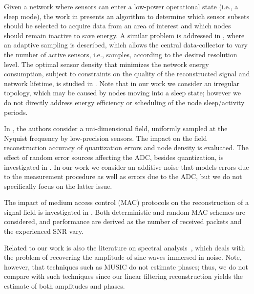 \documentclass[final, a4paper]{IEEEtran}
\begin{document}
Given a network where sensors can enter a low-power operational
state (i.e., a sleep mode), the work in \cite{Perillo04}  presents an algorithm to determine which
sensor subsets should be selected to acquire data from an
area of interest and which nodes should remain inactive to
save energy.
A similar problem is addressed in \cite{Willett04}, where an adaptive sampling is
described, which
allows the central data-collector to vary the number of active
sensors, i.e., samples, according to the desired resolution level.
The optimal sensor density that minimizes the network energy consumption,
subject to constraints on the quality of the reconstructed signal and
network lifetime, is studied in \cite{Maleki05}.
Note that in our work we consider an irregular topology, which may be
caused by nodes moving into a sleep state; however we do not directly
address energy efficiency or scheduling of the node sleep/activity
periods.

In \cite{Kumar03}, the authors consider a uni-dimensional field, uniformly sampled at the
Nyquist frequency by low-precision sensors. The impact on the
field reconstruction accuracy of quantization errors
and node density is evaluated.
The effect of random error sources affecting the ADC, besides quantization,
is investigated in \cite{Ergen06}.
In our work we consider an additive noise that models errors due to the measurement
procedure as well as errors due to the ADC, but we do not specifically focus
on the latter issue.

The impact of medium access control (MAC) protocols on
the reconstruction of a signal field is investigated in \cite{Dong04}.
Both deterministic and random MAC schemes are considered,
and performance are derived as the number of received packets and
the experienced SNR vary.

Related to our work is also the literature on
spectral analysis~\cite{Maravic, Stoica}, which
deals with the problem of recovering the amplitude of sine waves
immersed in noise.
Note, however, that techniques such as MUSIC do not estimate phases; thus,
we do not compare with such techniques since our linear filtering reconstruction yields the
estimate of both amplitudes and phases.
\end{document}
